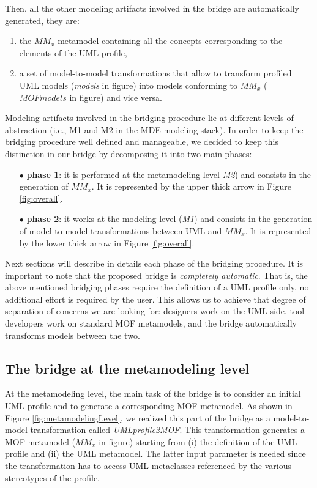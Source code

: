 Then, all the other modeling artifacts involved in the bridge are automatically generated, they are:
\begin{enumerate}
	\item the $MM_x$ metamodel containing all the concepts corresponding to the elements of the UML profile,
	\item a set of model-to-model transformations that allow to transform profiled UML models (\textit{models} in figure) into models
conforming to $MM_x$ ($MOF models$ in figure) and vice versa.
\end{enumerate}
%
Modeling artifacts involved in the bridging procedure lie at different levels of abstraction  
(i.e., M1 and M2 in the MDE modeling stack). In order to keep the bridging procedure well defined and manageable,
we decided to keep this distinction in our bridge by decomposing it into two main phases: 
%
\begin{itemize}
	\item[$\bullet$] \textbf{phase 1}: it is performed at the metamodeling level \textit{M2}) and consists in the generation of $MM_x$.
	It is represented by the upper thick arrow in Figure \ref{fig:overall}. 
	\item[$\bullet$] \textbf{phase 2}: it works at the modeling level (\textit{M1}) and consists in the generation of model-to-model 
	transformations between UML and $MM_x$. It is represented by the lower thick arrow in Figure \ref{fig:overall}.
\end{itemize}
%
Next sections will describe in details each phase of the bridging procedure.
It is important to note that the proposed bridge is \textit{completely automatic}. That is, the above mentioned bridging phases require 
the definition of a UML profile only, no additional effort is required by the user. This allows us to achieve
that degree of separation of concerns we are looking for: designers work on the UML side, tool developers work on standard MOF metamodels,
and the bridge automatically transforms models between the two.


\subsection{The bridge at the metamodeling level}\label{sec:metamodelLevel}
At the metamodeling level, the main task of the bridge is to consider an initial UML profile and to generate a corresponding MOF metamodel.
As shown in Figure \ref{fig:metamodelingLevel}, we realized this part of the bridge as a model-to-model transformation called 
\textit{UMLprofile2MOF}. This transformation generates a MOF metamodel ($MM_x$ in figure) starting from (i) the definition of the UML profile and (ii) the UML metamodel. The latter input parameter is needed since the transformation has to access UML metaclasses referenced by the 
various stereotypes of the profile.

